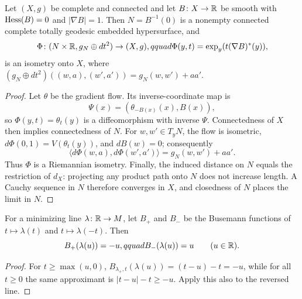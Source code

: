 \begin{proposition}
\label{prop:parallel-gradient-splitting}



Let $(X,g)$ be complete and connected and let $B\colon X\to\mathbb{R}$ be
smooth with $\operatorname{Hess}(B)=0$ and $|\nabla B|=1$. Then
$N=B^{-1}(0)$ is a nonempty connected complete totally geodesic embedded
hypersurface, and
$$\Phi\colon(N\times\mathbb{R},g_N\oplus dt^2)\to(X,g),qquad
\Phi(y,t)=\operatorname{exp}_y(t(\nabla B)^*(y)),$$
is an isometry onto $X$, where
$(g_N\oplus dt^2)((w,a),(w',a'))=g_N(w,w')+aa'$.
\end{proposition}
\begin{proof}
\sketch
{}
Let $\theta$ be the gradient flow. Its inverse-coordinate map is
$$\Psi(x)=(\theta_{-B(x)}(x),B(x)),$$
so $\Phi(y,t)=\theta_t(y)$ is a diffeomorphism with inverse $\Psi$.
Connectedness of $X$ then implies connectedness of $N$. For
$w,w'\in T_yN$, the flow is isometric,
$d\Phi(0,1)=V(\theta_t(y))$, and $dB(w)=0$; consequently
$$\langle d\Phi(w,a),d\Phi(w',a')\rangle=g_N(w,w')+aa'.$$
Thus $\Phi$ is a Riemannian isometry. Finally, the induced distance on
$N$ equals the restriction of $d_X$: projecting any product path onto
$N$ does not increase length. A Cauchy sequence in $N$ therefore
converges in $X$, and closedness of $N$ places the limit in $N$.
\end{proof}

\begin{lemma}
\label{lem:busemann-along-line}






For a minimizing line $\lambda\colon\mathbb{R}\to M$, let $B_+$ and $B_-$
be the Busemann functions of $t\mapsto\lambda(t)$ and
$t\mapsto\lambda(-t)$. Then
$$B_+(\lambda(u))=-u,qquad B_-(\lambda(u))=u\qquad(u\in\mathbb{R}).$$
\end{lemma}
\begin{proof}
\sketch

For $t\ge\max(u,0)$,
$B_{\lambda_+,t}(\lambda(u))=(t-u)-t=-u$, while for all $t\ge0$ the
same approximant is $|t-u|-t\ge-u$. Apply this also to the reversed
line.
\end{proof}


